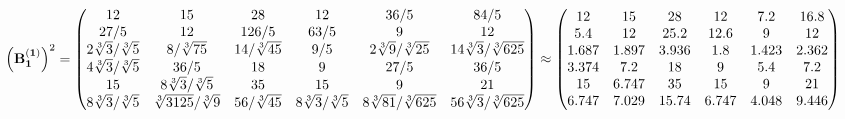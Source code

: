 \documentclass[10pt,a4paper]{article}
\begin{document}
	\[
		\left(\bold{B_1^{(1)}}\right)^{2} = 
		\begin{pmatrix}
			{{12}}{} & {{15}}{} & {{28}}{} & {{12}}{} & {{36}} / {{5}} & {{84}} / {{5}} \\
			{{27}} / {{5}} & {{12}}{} & {{126}} / {{5}} & {{63}} / {{5}} & {{9}}{} & {{12}}{} \\
			{{2}\sqrt[3]{3}} / {\sqrt[3]{5}} & {{8}} / {\sqrt[3]{75}} & {{14}} / {\sqrt[3]{45}} & {{9}} / {{5}} & {{2}\sqrt[3]{9}} / {\sqrt[3]{25}} & {{14}\sqrt[3]{3}} / {\sqrt[3]{625}} \\
			{{4}\sqrt[3]{3}} / {\sqrt[3]{5}} & {{36}} / {{5}} & {{18}}{} & {{9}}{} & {{27}} / {{5}} & {{36}} / {{5}} \\
			{{15}}{} & {{8}\sqrt[3]{3}} / {\sqrt[3]{5}} & {{35}}{} & {{15}}{} & {{9}}{} & {{21}}{} \\
			{{8}\sqrt[3]{3}} / {\sqrt[3]{5}} & {\sqrt[3]{3125}} / {\sqrt[3]{9}} & {{56}} / {\sqrt[3]{45}} & {{8}\sqrt[3]{3}} / {\sqrt[3]{5}} & {{8}\sqrt[3]{81}} / {\sqrt[3]{625}} & {{56}\sqrt[3]{3}} / {\sqrt[3]{625}} \\
		\end{pmatrix}
		\approx
		\begin{pmatrix}
			12       & 15       & 28       & 12       & 7.2      & 16.8     \\
			5.4      & 12       & 25.2     & 12.6     & 9        & 12       \\
			1.687    & 1.897    & 3.936    & 1.8      & 1.423    & 2.362    \\
			3.374    & 7.2      & 18       & 9        & 5.4      & 7.2      \\
			15       & 6.747    & 35       & 15       & 9        & 21       \\
			6.747    & 7.029    & 15.74    & 6.747    & 4.048    & 9.446    \\
		\end{pmatrix}
	\]
\end{document}
